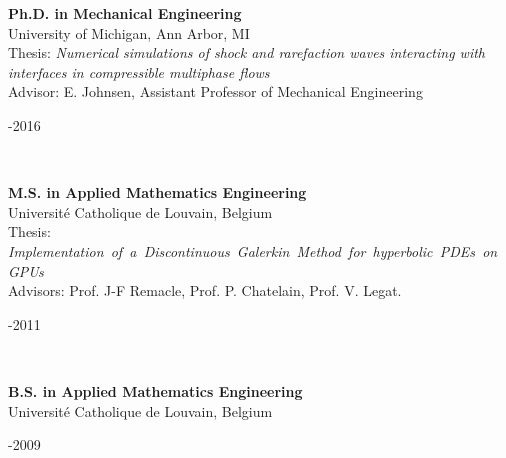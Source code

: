 \documentclass[11pt,letterpaper]{article}
\newcommand{\raisedrule}[2][0em]{\leaders\hbox{\rule[#1]{1pt}{#2}}\hfill}
\newcommand*{\sectionfont}{\Large\sffamily\mdseries\upshape}
\begin{document}
\begin{minipage}[t]{0.82\textwidth}%
  \textbf{Ph.D. in Mechanical Engineering}\\%
  University of Michigan, Ann Arbor, MI\\%
  Thesis: \textit{Numerical simulations of shock and rarefaction waves interacting with interfaces in compressible multiphase flows}\\%
  Advisor: E. Johnsen, Assistant Professor of Mechanical Engineering%
\end{minipage}\hfill%
\begin{minipage}[t]{0.15\textwidth}-2016%
\end{minipage}\\[2ex]%
\begin{minipage}[t]{0.82\textwidth}%
  \textbf{M.S. in Applied Mathematics Engineering}\\%
  Universit\'{e} Catholique de Louvain, Belgium\\%
  Thesis: \textit{\mbox{Implementation of a Discontinuous Galerkin Method for hyperbolic PDEs on GPUs}}\\%
  Advisors: Prof. J-F Remacle, Prof. P. Chatelain, Prof. V. Legat.%
\end{minipage}\hfill%
\begin{minipage}[t]{0.15\textwidth}-2011%
\end{minipage}\\[2ex]%
\begin{minipage}[t]{0.82\textwidth}%
  \textbf{B.S. in Applied Mathematics Engineering}\\%
  Universit\'{e} Catholique de Louvain, Belgium%
\end{minipage}\hfill%
\begin{minipage}[t]{0.15\textwidth}-2009%
\end{minipage}\\[3ex]%
%
%
%
%
\end{document}
